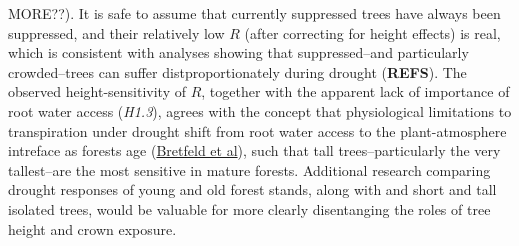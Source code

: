 \documentclass[]{article}
\begin{document}
MORE??). It is safe to assume that currently suppressed trees have
always been suppressed, and their relatively low \(R\) (after correcting
for height effects) is real, which is consistent with analyses showing
that suppressed--and particularly crowded--trees can suffer
distproportionately during drought (\textbf{REFS}). The observed
height-sensitivity of \(R\), together with the apparent lack of
importance of root water access (\emph{H1.3}), agrees with the concept
that physiological limitations to transpiration under drought shift from
root water access to the plant-atmosphere intreface as forests age
(\href{https://nph-onlinelibrary-wiley-com.smithsonian.idm.oclc.org/doi/full/10.1111/nph.15071}{Bretfeld
et al}), such that tall trees--particularly the very tallest--are the
most sensitive in mature forests. Additional research comparing drought
responses of young and old forest stands, along with and short and tall
isolated trees, would be valuable for more clearly disentanging the
roles of tree height and crown exposure.
\end{document}
